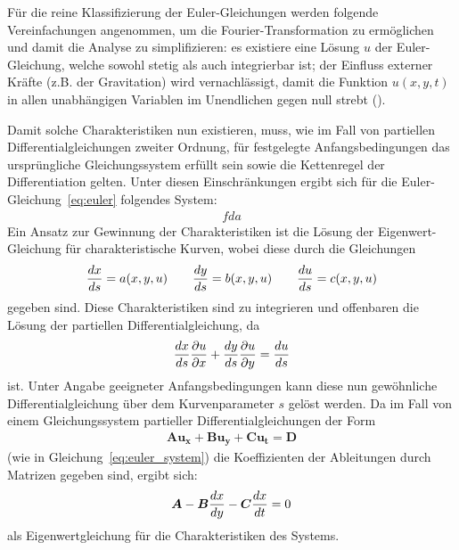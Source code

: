 Für die reine Klassifizierung der Euler-Gleichungen werden folgende Vereinfachungen angenommen, um die Fourier-Transformation zu ermöglichen und damit die Analyse zu simplifizieren: es existiere eine Lösung $u$ der Euler-Gleichung, welche sowohl stetig als auch integrierbar ist; der Einfluss externer Kräfte (z.B. der Gravitation) wird vernachlässigt, damit die Funktion $u(x,y,t)$ in allen unabhängigen Variablen im Unendlichen gegen null strebt (\cite[nach][S. 802]{bronstejn_taschenbuch_2020}).


Damit solche Charakteristiken nun existieren, muss, wie im Fall von partiellen Differentialgleichungen zweiter Ordnung, für festgelegte Anfangsbedingungen das ursprüngliche Gleichungssystem erfüllt sein sowie die Kettenregel der Differentiation gelten. Unter diesen Einschränkungen ergibt sich für die Euler-Gleichung~\eqref{eq:euler} folgendes System:
\begin{align*}
    fda
\end{align*}
Ein Ansatz zur Gewinnung der Charakteristiken ist die Lösung der Eigenwert-Gleichung für charakteristische Kurven, wobei diese durch die Gleichungen
\begin{align}
    \frac{d x}{d s} = a(x,y,u) \qquad \frac{d y}{d s}=b(x,y,u) \qquad \frac{d u}{d s} = c(x,y,u)
\end{align}
gegeben sind. Diese Charakteristiken sind zu integrieren und offenbaren die Lösung der partiellen Differentialgleichung, da
\begin{align*}
    \frac{d x}{d s} \frac{\partial u}{\partial x} + \frac{d y}{d s} \frac{\partial u}{\partial y} = \frac{d u}{d s}
\end{align*}
ist. Unter Angabe geeigneter Anfangsbedingungen kann diese nun gewöhnliche Differentialgleichung über dem Kurvenparameter $s$ gelöst werden. Da im Fall von einem Gleichungssystem partieller Differentialgleichungen der Form
\begin{align*}
    \boldsymbol{Au_x} + \boldsymbol{Bu_y} + \boldsymbol{Cu_t} = \boldsymbol{D}
\end{align*}
(wie in Gleichung~\eqref{eq:euler_system}) die Koeffizienten der Ableitungen durch Matrizen gegeben sind, ergibt sich:
\begin{align*}
    \boldsymbol{A}-\boldsymbol{B}\frac{d x}{d y} - \boldsymbol{C}\frac{d x}{d t} = 0
\end{align*}
als Eigenwertgleichung für die Charakteristiken des Systems.

